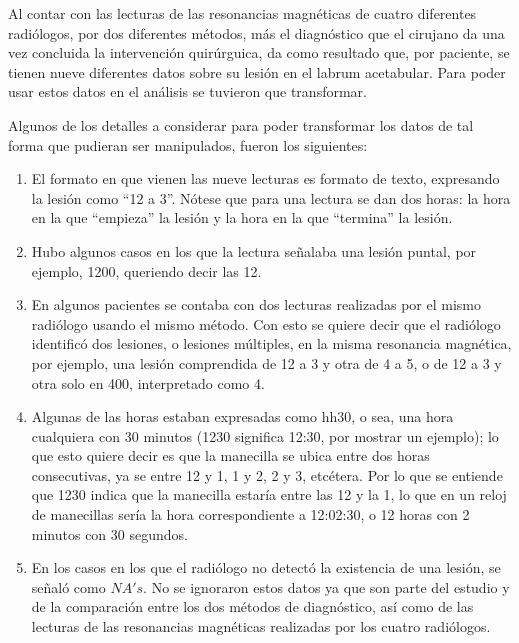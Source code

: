 \documentclass[11pt]{book}
\newcommand{\forceindent}{\leavevmode{\parindent=2em\indent}} %
\begin{document}
			\forceindent Al contar con las lecturas de las resonancias magnéticas de cuatro diferentes radiólogos, por dos diferentes métodos, más el diagnóstico que el cirujano da una vez concluida la intervención quirúrguica, da como resultado que, por paciente, se tienen nueve diferentes datos sobre su lesión en el labrum acetabular. Para poder usar estos datos en el análisis se tuvieron que transformar. 
			
			\forceindent Algunos de los detalles a considerar para poder transformar los datos de tal forma que pudieran ser manipulados, fueron los siguientes:
			\begin{enumerate}
				\item El formato en que vienen las nueve lecturas es formato de texto, expresando la lesión como ``12 a 3''. Nótese que para una lectura se dan dos horas: la hora en la que ``empieza'' la lesión y la hora en la que ``termina'' la lesión.
				\item Hubo algunos casos en los que la lectura señalaba una lesión puntal, por ejemplo, 1200, queriendo decir las 12.
				\item En algunos pacientes se contaba con dos lecturas realizadas por el mismo radiólogo usando el mismo método. Con esto se quiere decir que el radiólogo identificó dos lesiones, o lesiones múltiples, en la misma resonancia magnética, por ejemplo, una lesión comprendida de 12 a 3 y otra de 4 a 5, o de 12 a 3 y otra solo en 400, interpretado como 4.
				\item Algunas de las horas estaban expresadas como hh30, o sea, una hora cualquiera con 30 minutos (1230 significa 12:30, por mostrar un ejemplo); lo que esto quiere decir es que la manecilla se ubica entre dos horas consecutivas, ya se entre 12 y 1, 1 y 2, 2 y 3, etcétera. Por lo que se entiende que 1230 indica que la manecilla estaría entre las 12 y la 1, lo que en un reloj de manecillas sería la hora correspondiente a 12:02:30, o 12 horas con 2 minutos con 30 segundos.
				\item En los casos en los que el radiólogo no detectó la existencia de una lesión, se señaló como $NA's$. No se ignoraron estos datos ya que son parte del estudio y de la comparación entre los dos métodos de diagnóstico, así como de las lecturas de las resonancias magnéticas realizadas por los cuatro radiólogos.

\end{enumerate}
\end{document}
